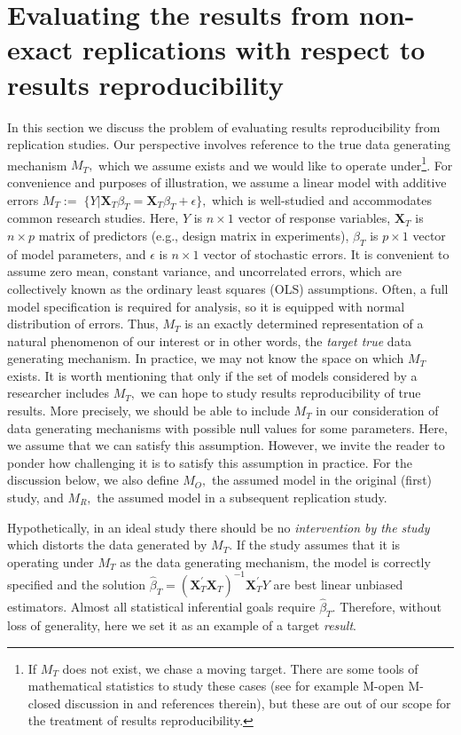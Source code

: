 \documentclass[meta,authordate]{jote-new-article}
\newcommand{\X}{\mathbf{X}}
\newcounter{result}
\begin{document}
\section{Evaluating the results from non-exact replications with respect to results reproducibility}

In this section we discuss the problem of evaluating results reproducibility from replication studies. Our perspective involves reference to the true data generating mechanism $M_T,$ which we assume exists and we would like to operate under\footnote{If $M_T$ does not exist, we chase a moving target. There are some tools of mathematical statistics to study these cases (see for example M-open M-closed discussion in \cite{bernardosmith2000} and references therein), but these are out of our scope for the treatment of results reproducibility.}. For convenience and purposes of illustration, we assume a linear model with additive errors $M_T:= \; \{Y|\X_T\beta_T = \X_T\beta_T+\epsilon\},$
which is well-studied and accommodates common research studies. Here, $Y$ is $n \times 1$ vector of response variables, $\X_T$ is $n \times p$ matrix of predictors (e.g., design matrix in experiments), $\beta_T$ is $p \times 1$ vector of model parameters, and $\epsilon$ is $n \times 1$ vector of stochastic errors. It is convenient to assume zero mean, constant variance, and uncorrelated errors, which are collectively known as the ordinary least squares (OLS) assumptions. Often, a full model specification is required for analysis, so it is equipped with normal distribution of errors. Thus, $M_T$ is an exactly determined representation of a natural phenomenon of our interest or in other words, the {\em target true} data generating mechanism. In practice, we may not know the space on which $M_T$ exists. It is worth mentioning that only if the set of models considered by a researcher includes $M_T,$ we can hope to study results reproducibility of true results. More precisely, we should be able to include $M_T$ in our consideration of data generating mechanisms with possible null values for some parameters. Here, we assume that we can satisfy this assumption. However, we invite the reader to ponder how challenging it is to satisfy this assumption in practice. For the discussion below, we also define $M_O,$ the assumed model in the original (first) study, and $M_R,$ the assumed model in a subsequent replication study.

Hypothetically, in an ideal study there should be no {\em intervention by the study} which distorts the data generated by $M_T.$ If the study assumes that it is operating under $M_T$ as the data generating mechanism, the model is correctly specified and the solution $\hat{\beta}_{T}= (\X_{T}^{'}\X_{T})^{-1}\X_{T}^{'} Y$ are best linear unbiased estimators. Almost all statistical inferential goals require $\hat{\beta}_{T}.$ Therefore, without loss of generality, here we set it as an example of a target {\em result}.
\end{document}
